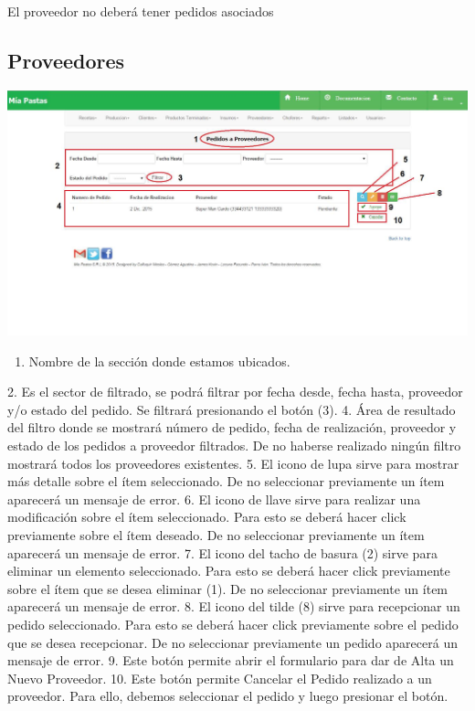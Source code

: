 \documentclass[letterpaper,10pt,english]{sphinxmanual}
\begin{document}
El proveedor no deberá tener pedidos asociados


\subsection{{}Proveedores}
\label{pedidosProveedor:proveedores}\label{pedidosProveedor::doc}
\includegraphics{pedidos_ini.jpg}
\begin{enumerate}
\item {} 
Nombre de la sección donde estamos ubicados.

\end{enumerate}

2.      Es el sector de filtrado, se podrá filtrar por fecha desde, fecha hasta, proveedor y/o estado del pedido. Se filtrará presionando el botón (3).
4.      Área de resultado del filtro donde se mostrará número de pedido, fecha de realización, proveedor y estado de los pedidos a proveedor filtrados. De no haberse realizado ningún filtro mostrará todos los proveedores existentes.
5.      El icono de lupa sirve para mostrar más detalle sobre el ítem seleccionado. De no seleccionar previamente un ítem aparecerá un mensaje de error.
6.      El icono de llave sirve para realizar una modificación sobre el ítem seleccionado. Para esto se deberá hacer click previamente sobre el ítem deseado. De no seleccionar previamente un ítem aparecerá un mensaje de error.
7.      El icono del tacho de basura (2) sirve para eliminar un elemento seleccionado. Para esto se deberá hacer click previamente sobre el ítem que se desea eliminar (1). De no seleccionar previamente un ítem aparecerá un mensaje de error.
8.      El icono del tilde (8) sirve para recepcionar un pedido seleccionado. Para esto se deberá hacer click previamente sobre el pedido que se desea recepcionar. De no seleccionar previamente un pedido aparecerá un mensaje de error.
9.      Este botón permite abrir el formulario para dar de Alta un Nuevo Proveedor.
10.     Este botón permite Cancelar el Pedido realizado a un proveedor. Para ello, debemos seleccionar el pedido y luego presionar el botón.
\end{document}
